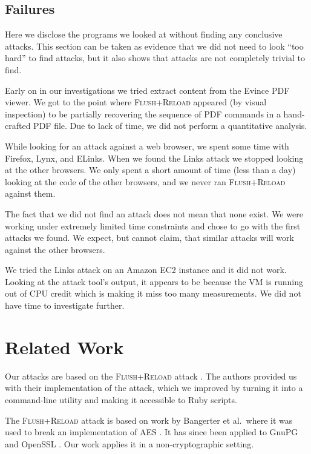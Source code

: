 \documentclass{acm_proc_article-sp}
\begin{document}
\subsection{Failures}
\label{sec:failures}

Here we disclose the programs we looked at without finding any conclusive
attacks. This section can be taken as evidence that we did not need to look
``too hard'' to find attacks, but it also shows that attacks are not completely
trivial to find.

Early on in our investigations we tried extract content from the Evince PDF
viewer. We got to the point where \textsc{Flush+Reload} appeared (by visual
inspection) to be partially recovering the sequence of PDF commands in
a hand-crafted PDF file. Due to lack of time, we did not perform a quantitative
analysis. 

While looking for an attack against a web browser, we spent some time with
Firefox, Lynx, and ELinks. When we found the Links attack we stopped looking at
the other browsers. We only spent a short amount of time (less than a day)
looking at the code of the other browsers, and we never ran \textsc{Flush+Reload} against
them.

The fact that we did not find an attack does not mean that none exist. We were
working under extremely limited time constraints and chose to go with the first
attacks we found. We expect, but cannot claim, that similar attacks will work
against the other browsers.

We tried the Links attack on an Amazon EC2 instance and it did not work. Looking
at the attack tool's output, it appears to be because the VM is running out of
CPU credit which is making it miss too many measurements. We did not have time
to investigate further.

\section{Related Work}
\label{sec:relwork}

Our attacks are based on the \textsc{Flush+Reload} attack \cite{yarom2013flush}.
The authors provided us with their implementation of the attack, which we
improved by turning it into a command-line utility and making it accessible to
Ruby scripts.

The \textsc{Flush+Reload} attack is based on work by Bangerter et al.\ where it was used
to break an implementation of AES \cite{gullasch2011cache}. It has since been
applied to GnuPG \cite{yarom2013flush} and OpenSSL \cite{benger2014ooh,
yarom2014recovering}. Our work applies it in a non-cryptographic setting.
\end{document}
